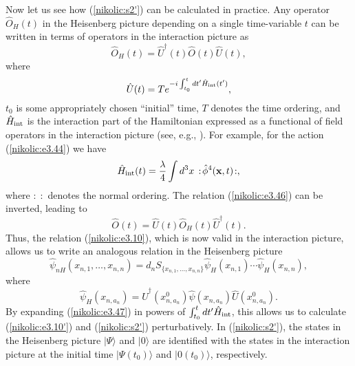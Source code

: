 \documentclass[12pt,twoside]{report} %
\begin{document}
Now let us see how (\ref{nikolic:s2'}) can be calculated in practice. Any operator
$\hat{O}_H(t)$ in the Heisenberg picture depending on a single time-variable $t$
can be written in terms of operators in the interaction picture as 
\begin{equation}\label{nikolic:e3.46}
\hat{O}_H(t)=\hat{U}^{\dagger}(t)\hat{O}(t)\hat{U}(t) , 
\end{equation}
where
\begin{equation}\label{nikolic:e3.47}
 \hat{U}(t)=Te^{-i\int_{t_0}^t dt' \hat{H}_{\rm int}(t')} ,
\end{equation}
$t_0$ is some appropriately chosen ``initial'' time, $T$ denotes the time ordering,
and $\hat{H}_{\rm int}$
is the interaction part of the Hamiltonian expressed as a functional of field operators
in the interaction picture (see, e.g., \cite{chengli}). 
For example, for the action (\ref{nikolic:e3.44}) we have
\begin{equation}\label{nikolic:e3.48}
 \hat{H}_{\rm int}(t)=\frac{\lambda}{4} \int d^3x \, :\!\hat{\phi}^4({\bf x},t)\!: ,
\end{equation}
where $:\;:$ denotes the normal ordering.
The relation (\ref{nikolic:e3.46}) can be inverted, leading to
\begin{equation}\label{nikolic:e3.49}
\hat{O}(t)=\hat{U}(t)\hat{O}_H(t)\hat{U}^{\dagger}(t) . 
\end{equation}
Thus, the relation (\ref{nikolic:e3.10}), which is now valid in the interaction picture,
allows us to write an analogous relation in the Heisenberg picture 
\begin{equation}\label{nikolic:e3.10'}
 \hat{\psi}_{nH}(x_{n,1}, \ldots , x_{n,n})  =  d_n 
S_{ \{x_{n,1}, \ldots , x_{n,n} \} } 
 \hat{\psi}_H(x_{n,1}) \cdots \hat{\psi}_H(x_{n,n}) ,
\end{equation}
where
\begin{equation}\label{nikolic:e3.50}
\hat{\psi}_H(x_{n,a_n})=\hat{U}^{\dagger}(x^0_{n,a_n})
\hat{\psi}(x_{n,a_n})\hat{U}(x^0_{n,a_n}) .
\end{equation}
By expanding (\ref{nikolic:e3.47}) in powers of $\int_{t_0}^t dt' \hat{H}_{\rm int}$,
this allows us to calculate (\ref{nikolic:e3.10'}) and (\ref{nikolic:s2'}) perturbatively.
In (\ref{nikolic:s2'}), the states in the Heisenberg picture $|\Psi\rangle$ and $|0\rangle$
are identified with the states in the interaction picture at the initial time
$|\Psi(t_0)\rangle$ and $|0(t_0)\rangle$, respectively.
\end{document}
